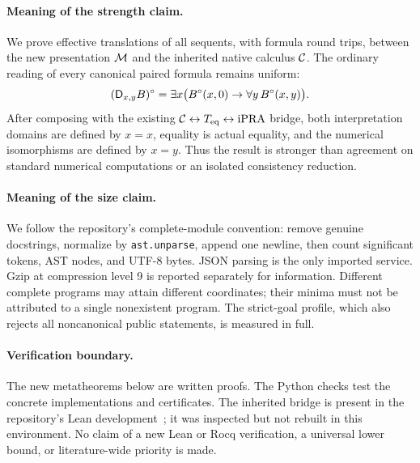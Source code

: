 \paragraph{Meaning of the strength claim.}
We prove effective translations of all sequents, with formula round
trips, between the new presentation $\mathcal M$ and the inherited native
calculus $\mathcal C$.  The ordinary reading of every canonical paired
formula remains uniform:
\[
  (\mathsf D_{x,y}B)^\circ
       =\exists x\bigl(B^\circ(x,0)\to\forall y\,B^\circ(x,y)\bigr).
\]
After composing with the existing $\mathcal C\leftrightarrow T_{\mathrm{eq}}
\leftrightarrow\mathrm{iPRA}$ bridge, both interpretation domains are defined
by $x=x$, equality is actual equality, and the numerical isomorphisms
are defined by $x=y$.  Thus the result is stronger than agreement on
standard numerical computations or an isolated consistency reduction.

\paragraph{Meaning of the size claim.}
We follow the repository's complete-module convention: remove genuine
docstrings, normalize by \texttt{ast.unparse}, append one newline, then
count significant tokens, AST nodes, and UTF-8 bytes.  JSON parsing is
the only imported service.  Gzip at compression level 9 is reported
separately for information.  Different complete programs may attain
different coordinates; their minima must not be attributed to a
single nonexistent program.  The strict-goal profile, which also
rejects all noncanonical public statements, is measured in full.

\paragraph{Verification boundary.}
The new metatheorems below are written proofs.  The Python checks test
the concrete implementations and certificates.  The inherited bridge
is present in the repository's Lean development~\cite{lean}; it was
inspected but not rebuilt in this environment.  No claim of a new Lean
or Rocq verification, a universal lower bound, or literature-wide
priority is made.
